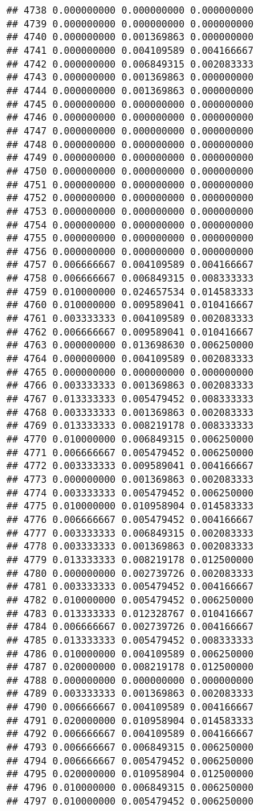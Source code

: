 \documentclass[
]{article}
\begin{document}
\begin{verbatim}
## 4738 0.000000000 0.000000000 0.000000000
## 4739 0.000000000 0.000000000 0.000000000
## 4740 0.000000000 0.001369863 0.000000000
## 4741 0.000000000 0.004109589 0.004166667
## 4742 0.000000000 0.006849315 0.002083333
## 4743 0.000000000 0.001369863 0.000000000
## 4744 0.000000000 0.001369863 0.000000000
## 4745 0.000000000 0.000000000 0.000000000
## 4746 0.000000000 0.000000000 0.000000000
## 4747 0.000000000 0.000000000 0.000000000
## 4748 0.000000000 0.000000000 0.000000000
## 4749 0.000000000 0.000000000 0.000000000
## 4750 0.000000000 0.000000000 0.000000000
## 4751 0.000000000 0.000000000 0.000000000
## 4752 0.000000000 0.000000000 0.000000000
## 4753 0.000000000 0.000000000 0.000000000
## 4754 0.000000000 0.000000000 0.000000000
## 4755 0.000000000 0.000000000 0.000000000
## 4756 0.000000000 0.000000000 0.000000000
## 4757 0.006666667 0.004109589 0.004166667
## 4758 0.006666667 0.006849315 0.008333333
## 4759 0.010000000 0.024657534 0.014583333
## 4760 0.010000000 0.009589041 0.010416667
## 4761 0.003333333 0.004109589 0.002083333
## 4762 0.006666667 0.009589041 0.010416667
## 4763 0.000000000 0.013698630 0.006250000
## 4764 0.000000000 0.004109589 0.002083333
## 4765 0.000000000 0.000000000 0.000000000
## 4766 0.003333333 0.001369863 0.002083333
## 4767 0.013333333 0.005479452 0.008333333
## 4768 0.003333333 0.001369863 0.002083333
## 4769 0.013333333 0.008219178 0.008333333
## 4770 0.010000000 0.006849315 0.006250000
## 4771 0.006666667 0.005479452 0.006250000
## 4772 0.003333333 0.009589041 0.004166667
## 4773 0.000000000 0.001369863 0.002083333
## 4774 0.003333333 0.005479452 0.006250000
## 4775 0.010000000 0.010958904 0.014583333
## 4776 0.006666667 0.005479452 0.004166667
## 4777 0.003333333 0.006849315 0.002083333
## 4778 0.003333333 0.001369863 0.002083333
## 4779 0.013333333 0.008219178 0.012500000
## 4780 0.000000000 0.002739726 0.002083333
## 4781 0.003333333 0.005479452 0.004166667
## 4782 0.010000000 0.005479452 0.006250000
## 4783 0.013333333 0.012328767 0.010416667
## 4784 0.006666667 0.002739726 0.004166667
## 4785 0.013333333 0.005479452 0.008333333
## 4786 0.010000000 0.004109589 0.006250000
## 4787 0.020000000 0.008219178 0.012500000
## 4788 0.000000000 0.000000000 0.000000000
## 4789 0.003333333 0.001369863 0.002083333
## 4790 0.006666667 0.004109589 0.004166667
## 4791 0.020000000 0.010958904 0.014583333
## 4792 0.006666667 0.004109589 0.004166667
## 4793 0.006666667 0.006849315 0.006250000
## 4794 0.006666667 0.005479452 0.006250000
## 4795 0.020000000 0.010958904 0.012500000
## 4796 0.010000000 0.006849315 0.006250000
## 4797 0.010000000 0.005479452 0.006250000

\end{verbatim}
\end{document}
